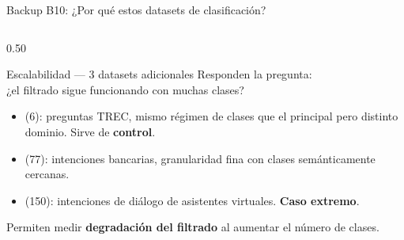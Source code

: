\begin{frame}{Backup B10: ¿Por qué estos datasets de clasificación?}
\begin{columns}[T]
\begin{column}{0.50\textwidth}
\begin{block}{\small Escalabilidad --- 3 datasets adicionales}
\scriptsize
Responden la pregunta:\\[2pt]
\alert{¿el filtrado sigue funcionando con muchas clases?}
\vspace{0.4em}
\begin{itemize}\setlength\itemsep{0pt}
  \item {} (6): preguntas TREC, mismo régimen de clases que el principal pero distinto dominio. Sirve de \textbf{control}.
  \item {} (77): intenciones bancarias, granularidad fina con clases semánticamente cercanas.
  \item {} (150): intenciones de diálogo de asistentes virtuales. \textbf{Caso extremo}.
\end{itemize}
\vspace{0.4em}
Permiten medir \textbf{degradación del filtrado} al aumentar el número de clases.
\end{block}
\end{column}

\end{columns}

\end{frame}

